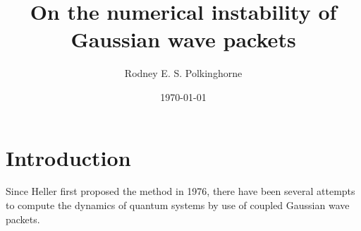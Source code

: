 \documentclass[aip,jcp,graphicx,draft]{revtex4-1}
\begin{document}

\title{On the numerical instability of Gaussian wave packets} %



\author{Rodney E. S. Polkinghorne}


\date{\today}

\begin{abstract}
\end{abstract}

\pacs{}%

\maketitle %

\section{Introduction}

Since Heller first proposed the method in 1976\cite{jcp-64-63}, there have been several attempts to compute the dynamics of quantum systems by use of coupled Gaussian wave packets.
\end{document}
